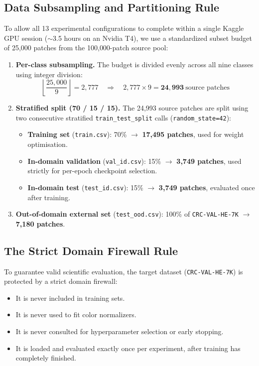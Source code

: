 \documentclass[11pt,a4paper]{article}
\begin{document}
\subsection{Data Subsampling and Partitioning Rule}
To allow all 13 experimental configurations to complete within a single Kaggle GPU
session ($\sim$3.5 hours on an Nvidia T4), we use a standardized subset budget of
25{,}000 patches from the 100{,}000-patch source pool:

\begin{enumerate}
  \item \textbf{Per-class subsampling.} The budget is divided evenly across all nine
        classes using integer division:
        \begin{equation}
          \left\lfloor \frac{25{,}000}{9} \right\rfloor = 2{,}777
          \quad\Longrightarrow\quad 2{,}777 \times 9 = \mathbf{24{,}993}\ \text{source patches}
        \end{equation}
  \item \textbf{Stratified split (70 / 15 / 15).} The 24{,}993 source patches are
        split using two consecutive stratified \texttt{train\_test\_split} calls
        (\texttt{random\_state=42}):
        \begin{itemize}
          \item \textbf{Training set} (\texttt{train.csv}): 70\% $\rightarrow$
                \textbf{17{,}495 patches}, used for weight optimisation.
          \item \textbf{In-domain validation} (\texttt{val\_id.csv}): 15\% $\rightarrow$
                \textbf{3{,}749 patches}, used strictly for per-epoch checkpoint
                selection.
          \item \textbf{In-domain test} (\texttt{test\_id.csv}): 15\% $\rightarrow$
                \textbf{3{,}749 patches}, evaluated once after training.
        \end{itemize}
  \item \textbf{Out-of-domain external set} (\texttt{test\_ood.csv}): 100\% of
        \texttt{CRC-VAL-HE-7K} $\rightarrow$ \textbf{7{,}180 patches}.
\end{enumerate}

\subsection{The Strict Domain Firewall Rule}
To guarantee valid scientific evaluation, the target dataset
(\texttt{CRC-VAL-HE-7K}) is protected by a strict domain firewall:
\begin{itemize}
  \item It is never included in training sets.
  \item It is never used to fit color normalizers.
  \item It is never consulted for hyperparameter selection or early stopping.
  \item It is loaded and evaluated exactly once per experiment, after training has
        completely finished.
\end{itemize}
\end{document}
